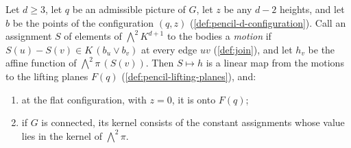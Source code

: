 \begin{lemma}
  \label{lem:pencil-flat-split}
  \leanok
  Let $d \ge 3$, let $q$ be an admissible picture of $G$, let $z$ be any
  $d - 2$ heights, and let $b$ be the points of the configuration
  $(q, z)$ (\cref{def:pencil-d-configuration}). Call an assignment $S$ of
  elements of $\bigwedge^2 K^{d+1}$ to the bodies a \emph{motion} if
  $S(u) - S(v) \in K\,(b_u \vee b_v)$ at every edge $uv$
  (\cref{def:join}), and let $h_v$ be the affine function of
  $\bigwedge^2 \pi\,(S(v))$. Then $S \mapsto h$ is a linear map from the
  motions to the lifting planes $F(q)$
  (\cref{def:pencil-lifting-planes}), and:
  \begin{enumerate}
    \item at the flat configuration, with $z = 0$, it is onto $F(q)$;
    \item if $G$ is connected, its kernel consists of the constant
      assignments whose value lies in the kernel of $\bigwedge^2 \pi$.
  \end{enumerate}
\end{lemma}
